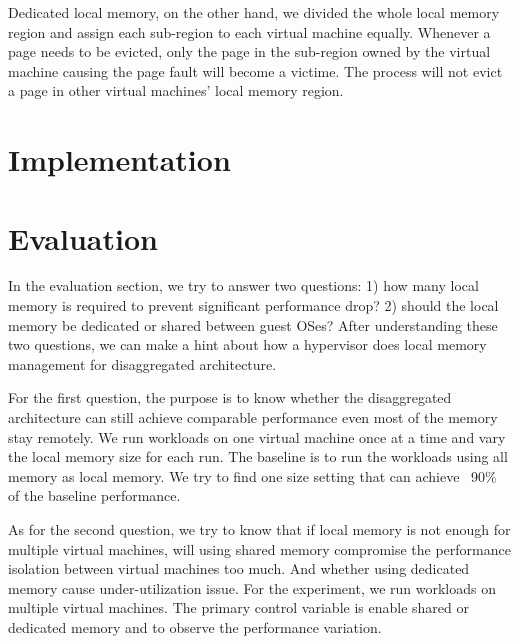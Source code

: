 \documentclass[twocolumn]{article}
\begin{document}
Dedicated local memory, on the other hand, we divided the whole local memory region and assign each sub-region to each virtual machine equally. Whenever a page needs to be evicted, only the page in the sub-region owned by the virtual machine causing the page fault will become a victime. The process will not evict a page in other virtual machines' local memory region.

\section{Implementation}

\section{Evaluation}
In the evaluation section, we try to answer two questions: 1) how many local memory is required to prevent significant performance drop? 2) should the local memory be dedicated or shared between guest OSes? After understanding these two questions, we can make a hint about how a hypervisor does local memory management for disaggregated architecture.

For the first question, the purpose is to know whether the disaggregated architecture can still achieve comparable performance even most of the memory stay remotely. We run workloads on one virtual machine once at a time and vary the local memory size for each run. The baseline is to run the workloads using all memory as local memory. We try to find one size setting that can achieve ~90\% of the baseline performance.

As for the second question, we try to know that if local memory is not enough for multiple virtual machines, will using shared memory compromise the performance isolation between virtual machines too much. And whether using dedicated memory cause under-utilization issue. For the experiment, we run workloads on multiple virtual machines. The primary control variable is enable shared or dedicated memory and to observe the performance variation.

{}

\end{document}
